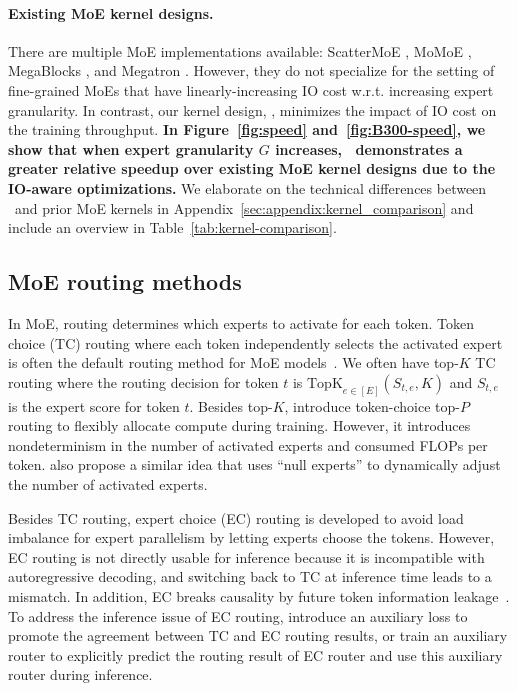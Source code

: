\paragraph{Existing MoE kernel designs.} There are multiple MoE implementations available: ScatterMoE \citep{tan2024scattered}, MoMoE \citep{costin2025momoe}, MegaBlocks \citep{gale2023megablocks}, and Megatron \citep{shoeybi2019megatron}. However, they do not specialize for the setting of fine-grained MoEs that have linearly-increasing IO cost w.r.t. increasing expert granularity. In contrast, our kernel design, \Algname, minimizes the impact of IO cost on the training throughput. \textbf{In Figure~\ref{fig:speed} and~\ref{fig:B300-speed}, we show that when expert granularity $G$ increases, \Algname~demonstrates a greater relative speedup over existing MoE kernel designs due to the IO-aware optimizations.} We elaborate on the technical differences between \Algname~and prior MoE kernels in Appendix~\ref{sec:appendix:kernel_comparison} and include an overview in Table~\ref{tab:kernel-comparison}.


\subsection{MoE routing methods}\label{sec:background:routing-methods}

In MoE, routing determines which experts to activate for each token. Token choice (TC) routing where each token independently selects the activated expert is often the default routing method for MoE models~\citep{shazeer2017outrageouslylargeneuralnetworks}. We often have top-$K$ TC routing where the routing decision for token $t$ is $\mathrm{TopK}_{e\in[E]}(S_{t, e}, K)$ and $S_{t, e}$ is the expert score for token $t$. Besides top-$K$, \citet{huang2024harder} introduce token-choice top-$P$ routing to flexibly allocate compute during training. However, it introduces nondeterminism in the number of activated experts and consumed FLOPs per token. \citet{zeng-etal-2024-adamoe} also propose a similar idea that uses ``null experts'' to dynamically adjust the number of activated experts. 

Besides TC routing, expert choice (EC) routing is developed to avoid load imbalance for expert parallelism \citep{zhou2022mixture} by letting experts choose the tokens. However, EC routing is not directly usable for inference because it is incompatible with autoregressive decoding, and switching back to TC at inference time leads to a mismatch. In addition, EC breaks causality by future token information leakage~\citep{wang2024auxiliary}. To address the inference issue of EC routing, \citet{raposo2024mixture} introduce an auxiliary loss to promote the agreement between TC and EC routing results, or train an auxiliary router to explicitly predict the routing result of EC router and use this auxiliary router during inference.

